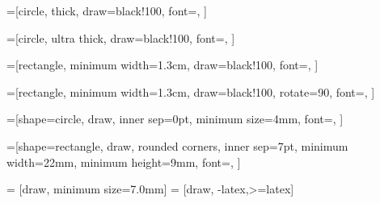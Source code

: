 \usepackage{tikz}
\usetikzlibrary{fit}					%
\usetikzlibrary{backgrounds}	%
\usetikzlibrary{calc, arrows, fit, positioning, patterns, decorations.pathreplacing, shapes}
\usetikzlibrary{shadows}
\usepackage{xifthen}
\usetikzlibrary{arrows.meta}
\usepackage{smartdiagram} %

=[circle,
                 thick,
                 draw=black!100,
                 font=\small,
                ]

=[circle,
                 ultra thick,
                 draw=black!100,
                 font=\small,
                ]

=[rectangle,
                     minimum width=1.3cm,
                     draw=black!100,
                     font=\small,
                    ]

=[rectangle,
                     minimum width=1.3cm,
                     draw=black!100,
                     rotate=90,
                     font=\small,
                    ]

=[shape=circle,
                       draw,
                       inner sep=0pt,
                       minimum size=4mm,
                       font=\scriptsize,
                      ]

=[shape=rectangle,
                       draw,
                       rounded corners,
                       inner sep=7pt,
                       minimum width=22mm,
                       minimum height=9mm,
                       font=\footnotesize,
                      ]

 = [draw, minimum size=7.0mm]
 = [draw, -latex,>=latex]

